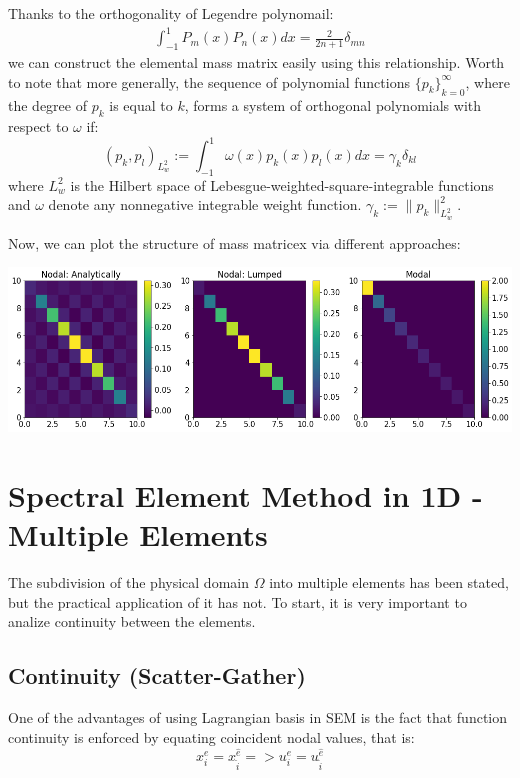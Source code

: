 \documentclass[
  a4paper,
  10pt]{article}
\begin{document}
Thanks to the orthogonality of Legendre polynomail: \begin{align}
\int_{-1}^1 P_m(x)P_n(x) dx = \frac{2}{2n+1}\delta_{mn} 
\end{align} we can construct the elemental mass matrix easily using this
relationship. Worth to note that more generally, the sequence of
polynomial functions \({\{p_k\}}^{\infty}_{k=0}\), where the degree of
\(p_k\) is equal to \(k\), forms a system of orthogonal polynomials with
respect to \(\omega\) if: \begin{equation}
(p_k,p_l)_{L_w^2}:=\int_{-1}^1\omega(x)p_k(x)p_l(x)dx= \gamma_k\delta_{kl}
\end{equation} where \(L_w^2\) is the Hilbert space of
Lebesgue-weighted-square-integrable functions and \(\omega\) denote any
nonnegative integrable weight function. \(\gamma_k:=\|p_k\|^2_{L_w^2}\).

Now, we can plot the structure of mass matricex via different
approaches:

\includegraphics{figs/64cf6104567524d8214da8aaba5fa3b1b72eea69.png}

\hypertarget{spectral-element-method-in-1d---multiple-elements}{%
\section{Spectral Element Method in 1D - Multiple
Elements}\label{spectral-element-method-in-1d---multiple-elements}}

The subdivision of the physical domain \(\Omega\) into multiple elements
has been stated, but the practical application of it has not. To start,
it is very important to analize continuity between the elements.

\hypertarget{continuity-scatter-gather}{%
\subsection{Continuity
(Scatter-Gather)}\label{continuity-scatter-gather}}

One of the advantages of using Lagrangian basis in SEM is the fact that
function continuity is enforced by equating coincident nodal values,
that is: \begin{equation}
    x_{i}^{e}=x_{\hat{i}}^{\hat{e}} => u_{i}^{e}=u_{\hat{i}}^{\hat{e}}
\end{equation}
\end{document}
